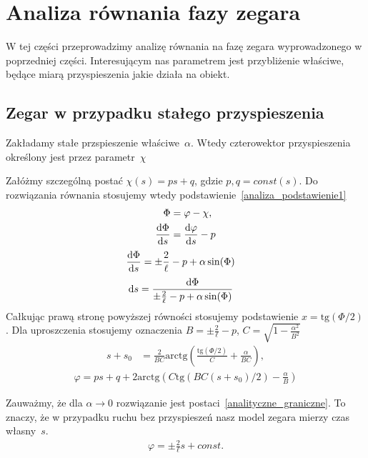 \section{Analiza równania fazy zegara}
W tej części przeprowadzimy analizę równania na fazę zegara
wyprowadzonego w poprzedniej części.
Interesującym nas parametrem jest przybliżenie właściwe, będące miarą 
przyspieszenia jakie działa na obiekt. 

\subsection{Zegar w przypadku stałego przyspieszenia}
Zakładamy stałe przspieszenie właściwe~$\alpha$. Wtedy czterowektor 
przyspieszenia określony jest przez parametr~$\chi$

Załóżmy szczególną postać $\chi (s) = p s + q$, 
gdzie $p,q = const(s)$. Do rozwiązania równania stosujemy wtedy 
podstawienie~\eqref{analiza_podstawienie1}
\begin{align} \label{analiza_podstawienie1}
\Phi &= \varphi - \chi,\\
\frac{\text{d} \Phi}{\text{d} s} &= \frac{\text{d} \varphi }{\text{d} s} - p
\end{align}
\begin{align*}
\frac{\text{d} \Phi}{\text{d} s} &= \pm \frac{2}{\ell} - p  + 
\alpha \sin (\Phi ) 
\end{align*}
\begin{align*}
\text{d} s & = \frac{\text{d} \Phi}{ \pm \frac{2}{\ell} - p  + 
\alpha \sin (\Phi ) }
\end{align*}
Całkując prawą stronę powyższej równości stosujemy podstawienie
 $ x = \text{tg} (\Phi/2)$. Dla uproszczenia stosujemy oznaczenia
$B = \pm \frac{2}{\ell} - p $,
$C =  \sqrt{ 1 - \frac{\alpha^2}{B^2}}$
\begin{align*}
s +s_0 & = \frac{2}{BC} \text{arctg}  
\left( \frac{ \text{tg} (\Phi/2)}{C} +\frac{\alpha}{BC} \right),
\end{align*}
\begin{align*}
\varphi = ps + q + 
2\text{arctg} \left( 
C \text{tg} \left( BC(s + s_0)/2\right)  - \frac{\alpha}{B}
\right)
\end{align*}

Zauważmy, że dla $\alpha \to 0$ rozwiązanie jest 
postaci~\eqref{analityczne_graniczne}. To znaczy, że w przypadku ruchu
bez przyspieszeń nasz model zegara mierzy czas własny~$s$.
\begin{align}\label{analityczne_graniczne}
\varphi = \pm \frac{2}{\ell} s + const.
\end{align}

